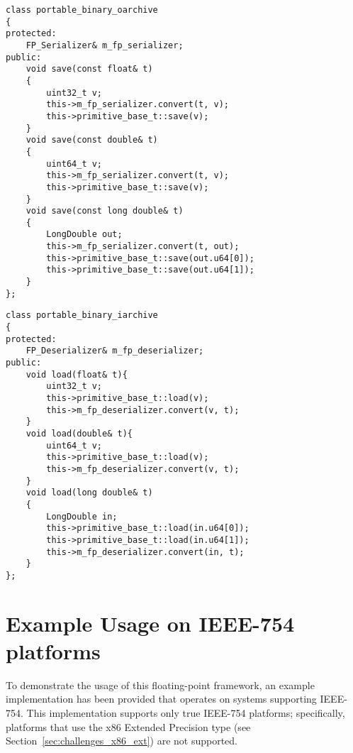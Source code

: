 \noindent
\begin{minipage}{\linewidth}
\begin{singlespace}
\begin{lstlisting}[caption=Modifications to the \code{portable\_binary\_oarchive} class., label=listing:framework_boost_oarchive]
class portable_binary_oarchive
{
protected:
    FP_Serializer& m_fp_serializer;    
public:
    void save(const float& t)
    {
        uint32_t v;
        this->m_fp_serializer.convert(t, v);
        this->primitive_base_t::save(v);
    }
    void save(const double& t)
    {
        uint64_t v;
        this->m_fp_serializer.convert(t, v);
        this->primitive_base_t::save(v);
    }
    void save(const long double& t)
    {
        LongDouble out;
        this->m_fp_serializer.convert(t, out);
        this->primitive_base_t::save(out.u64[0]);
        this->primitive_base_t::save(out.u64[1]);
    }
};
\end{lstlisting}
\end{singlespace}
\end{minipage}

\noindent
\begin{minipage}{\linewidth}
\begin{singlespace}
\begin{lstlisting}[caption=Modifications to the \code{portable\_binary\_iarchive} class., label=listing:framework_boost_iarchive]
class portable_binary_iarchive
{
protected:
    FP_Deserializer& m_fp_deserializer;    
public:
    void load(float& t){
        uint32_t v;
        this->primitive_base_t::load(v);
        this->m_fp_deserializer.convert(v, t);
    }    
    void load(double& t){
        uint64_t v;
        this->primitive_base_t::load(v);
        this->m_fp_deserializer.convert(v, t);
    }    
    void load(long double& t)
    {
        LongDouble in;
        this->primitive_base_t::load(in.u64[0]);
        this->primitive_base_t::load(in.u64[1]);
        this->m_fp_deserializer.convert(in, t);
    }
};
\end{lstlisting}
\end{singlespace}
\end{minipage}

\section{Example Usage on IEEE-754 platforms}
\label{sec:framework_example}
To demonstrate the usage of this floating-point framework, an example implementation has been provided that operates on systems supporting IEEE-754. This implementation supports only true IEEE-754 platforms; specifically, platforms that use the x86 Extended Precision type (see Section~\ref{sec:challenges_x86_ext}) are not supported.


